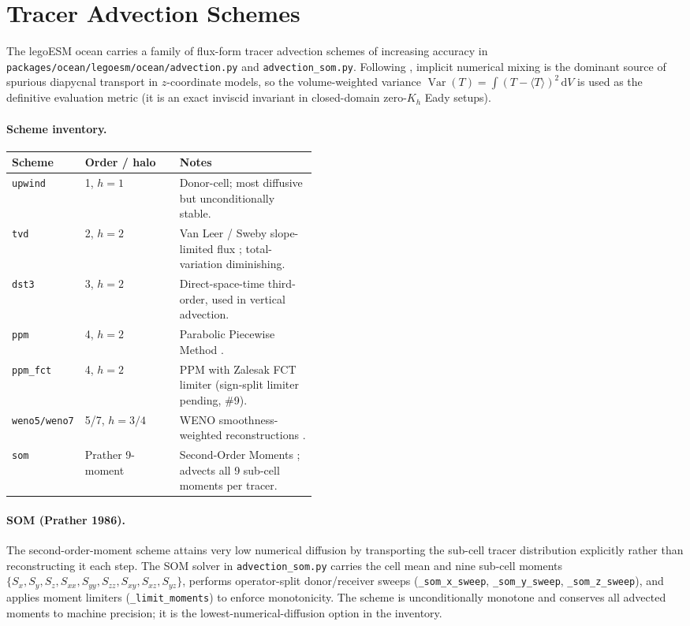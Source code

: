 \documentclass[11pt,twoside]{report}
\newcommand{\dd}{\mathrm{d}}
\DeclareMathOperator{\Var}{Var}
\begin{document}
\section{Tracer Advection Schemes}
\label{sec:ocean-advection}

The legoESM ocean carries a family of flux-form tracer advection
schemes of increasing accuracy in
\texttt{packages/ocean/legoesm/ocean/advection.py} and
\texttt{advection\_som.py}.  Following \citet{Hill2012}, implicit
numerical mixing is the dominant source of spurious diapycnal
transport in $z$-coordinate models, so the volume-weighted variance
$\Var(T) = \int (T-\langle T\rangle)^2\,\dd V$ is used as the
definitive evaluation metric (it is an exact inviscid invariant in
closed-domain zero-$K_h$ Eady setups).

\paragraph{Scheme inventory.}
\begin{center}
\begin{tabular}{llp{0.45\linewidth}}
\toprule
Scheme & Order / halo & Notes \\
\midrule
\texttt{upwind}      & 1, $h{=}1$ & Donor-cell; most diffusive but unconditionally stable. \\
\texttt{tvd}         & 2, $h{=}2$ & Van Leer / Sweby slope-limited flux \citep{vanLeer1979}; total-variation diminishing. \\
\texttt{dst3}        & 3, $h{=}2$ & Direct-space-time third-order, used in vertical advection. \\
\texttt{ppm}         & 4, $h{=}2$ & Parabolic Piecewise Method \citep{ColellaWoodward1984}. \\
\texttt{ppm\_fct}    & 4, $h{=}2$ & PPM with Zalesak FCT limiter (sign-split limiter pending, \#9). \\
\texttt{weno5/weno7} & 5/7, $h{=}3/4$ & WENO smoothness-weighted reconstructions \citep{JiangShu1996}. \\
\texttt{som}         & Prather 9-moment & Second-Order Moments \citep{Prather1986}; advects all 9 sub-cell moments per tracer. \\
\bottomrule
\end{tabular}
\end{center}

\paragraph{SOM (Prather 1986).}
The second-order-moment scheme \citep{Prather1986} attains very low
numerical diffusion by transporting the sub-cell tracer distribution
explicitly rather than reconstructing it each step.  The SOM solver in
\texttt{advection\_som.py} carries the cell mean and
nine sub-cell moments $\{S_x, S_y, S_z, S_{xx}, S_{yy}, S_{zz},
S_{xy}, S_{xz}, S_{yz}\}$, performs operator-split donor/receiver
sweeps (\texttt{\_som\_x\_sweep}, \texttt{\_som\_y\_sweep},
\texttt{\_som\_z\_sweep}), and applies moment limiters
(\texttt{\_limit\_moments}) to enforce monotonicity.  The scheme is
unconditionally monotone and conserves all advected moments to machine
precision; it is the lowest-numerical-diffusion option in the
inventory.
\end{document}
